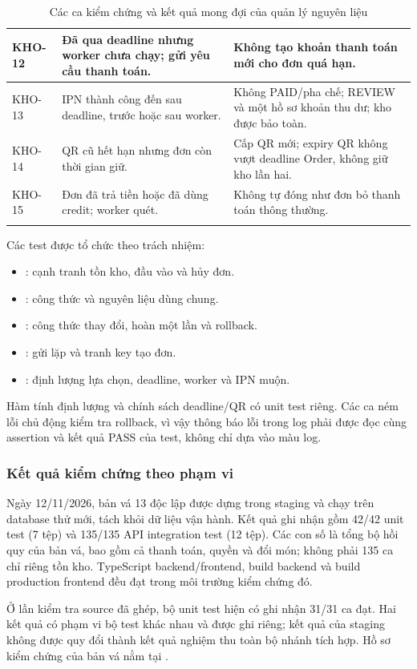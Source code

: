 \begin{longtable}{|p{.10\linewidth}|p{.43\linewidth}|p{.36\linewidth}|}
KHO-12 & Đã qua deadline nhưng worker chưa chạy; gửi yêu cầu thanh toán. & Không tạo khoản thanh toán mới cho đơn quá hạn.\\\hline
KHO-13 & IPN thành công đến sau deadline, trước hoặc sau worker. & Không PAID/pha chế; REVIEW và một hồ sơ khoản thu dư; kho được bảo toàn.\\\hline
KHO-14 & QR cũ hết hạn nhưng đơn còn thời gian giữ. & Cấp QR mới; expiry QR không vượt deadline Order, không giữ kho lần hai.\\\hline
KHO-15 & Đơn đã trả tiền hoặc đã dùng credit; worker quét. & Không tự đóng như đơn bỏ thanh toán thông thường.\\\hline
\caption{Các ca kiểm chứng và kết quả mong đợi của quản lý nguyên liệu}
\end{longtable}\endgroup

Các test được tổ chức theo trách nhiệm:
\begin{itemize}
\item {}: cạnh tranh tồn kho, đầu vào và hủy đơn.
\item {}: công thức và nguyên liệu dùng chung.
\item {}: công thức thay đổi, hoàn một lần và rollback.
\item {}: gửi lặp và tranh key tạo đơn.
\item {}: định lượng lựa chọn, deadline, worker và IPN muộn.
\end{itemize}
Hàm tính định lượng và chính sách deadline/QR có unit test riêng. Các ca ném lỗi chủ động kiểm tra rollback, vì vậy thông báo lỗi trong log phải được đọc cùng assertion và kết quả PASS của test, không chỉ dựa vào màu log.

\subsubsection{Kết quả kiểm chứng theo phạm vi}
Ngày 12/11/2026, bản vá 13 độc lập được dựng trong staging và chạy trên database thử mới, tách khỏi dữ liệu vận hành. Kết quả ghi nhận gồm 42/42 unit test (7 tệp) và 135/135 API integration test (12 tệp). Các con số là tổng bộ hồi quy của bản vá, bao gồm cả thanh toán, quyền và đổi món; không phải 135 ca chỉ riêng tồn kho. TypeScript backend/frontend, build backend và build production frontend đều đạt trong môi trường kiểm chứng đó.

Ở lần kiểm tra source đã ghép, bộ unit test hiện có ghi nhận 31/31 ca đạt. Hai kết quả có phạm vi bộ test khác nhau và được ghi riêng; kết quả của staging không được quy đổi thành kết quả nghiệm thu toàn bộ nhánh tích hợp. Hồ sơ kiểm chứng của bản vá nằm tại .

